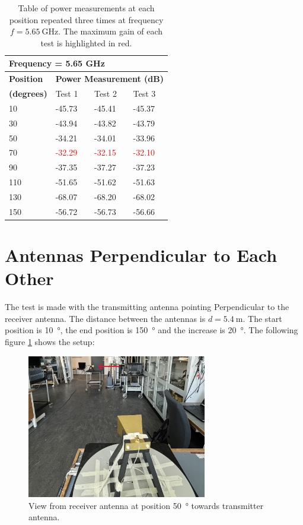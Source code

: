 \begin{table}[H]
    \centering
    \begin{tabular}{l|l|l|l}
        \multicolumn{4}{l}{\textbf{Frequency = 5.65 GHz}}         \\
        \hline
        \textbf{Position} & \multicolumn{3}{l}{\textbf{Power Measurement (dB)}} \\
        \textbf{(degrees)}  & Test 1    & Test 2  & Test 3  \\
        \hline
        \hline
        10      & -45.73    & -45.41    & -45.37 \\
        30      & -43.94    & -43.82    & -43.79 \\
        50      & -34.21    & -34.01    & -33.96 \\
        70      & \textcolor{red}{-32.29}    & \textcolor{red}{-32.15}    & \textcolor{red}{-32.10} \\
        90      & -37.35    & -37.27    & -37.23 \\
        110     & -51.65    & -51.62    & -51.63 \\
        130     & -68.07    & -68.20    & -68.02 \\
        150     & -56.72    & -56.73    & -56.66
        \end{tabular}
    \caption{Table of power measurements at each position repeated three times at frequency $f=\SI{5.65}{\giga\hertz}$. The maximum gain of each test is highlighted in red.}
    \label{tab:a2_2b}
\end{table}


\section{Antennas Perpendicular to Each Other}
The test is made with the transmitting antenna pointing Perpendicular to the receiver antenna. The distance between the antennas is $d=\SI{5.4}{\meter}$. The start position is \SI{10}{\degree}, the end position is \SI{150}{\degree} and the increase is \SI{20}{\degree}. The following figure \ref{fig:a2_3} shows the setup:
\begin{figure}[H]
    \centering
    \includegraphics[width=0.7\textwidth]{figures/test_los_perpendicular.JPG}
    \caption{View from receiver antenna at position \SI{50}{\degree} towards transmitter antenna.} \label{fig:a2_3}
\end{figure}


